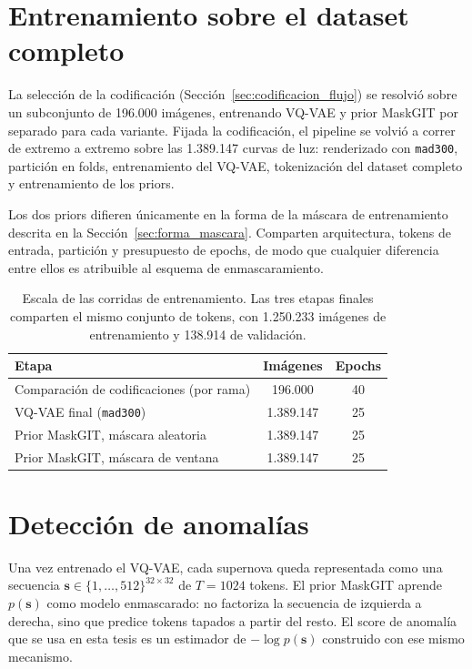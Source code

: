 \section{Entrenamiento sobre el dataset completo}
\label{sec:entrenamiento_full}

La selección de la codificación (Sección~\ref{sec:codificacion_flujo}) se resolvió sobre un subconjunto de 196.000 imágenes, entrenando VQ-VAE y prior MaskGIT por separado para cada variante. Fijada la codificación, el pipeline se volvió a correr de extremo a extremo sobre las 1.389.147 curvas de luz: renderizado con \texttt{mad300}, partición en folds, entrenamiento del VQ-VAE, tokenización del dataset completo y entrenamiento de los priors.

Los dos priors difieren únicamente en la forma de la máscara de entrenamiento descrita en la Sección~\ref{sec:forma_mascara}. Comparten arquitectura, tokens de entrada, partición y presupuesto de epochs, de modo que cualquier diferencia entre ellos es atribuible al esquema de enmascaramiento.

\begin{table}[H]
\centering
\begin{tabular}{|l|c|c|}
\hline
\textbf{Etapa} & \textbf{Imágenes} & \textbf{Epochs} \\
\hline
Comparación de codificaciones (por rama) & 196.000 & 40 \\
VQ-VAE final (\texttt{mad300}) & 1.389.147 & 25 \\
Prior MaskGIT, máscara aleatoria & 1.389.147 & 25 \\
Prior MaskGIT, máscara de ventana & 1.389.147 & 25 \\
\hline
\end{tabular}
\caption{Escala de las corridas de entrenamiento. Las tres etapas finales comparten el mismo conjunto de tokens, con 1.250.233 imágenes de entrenamiento y 138.914 de validación.}
\label{tab:corridas}
\end{table}

\section{Detección de anomalías}

Una vez entrenado el VQ-VAE, cada supernova queda representada como una secuencia $\mathbf{s} \in \{1, \ldots, 512\}^{32 \times 32}$ de $T = 1024$ tokens. El prior MaskGIT aprende $p(\mathbf{s})$ como modelo enmascarado: no factoriza la secuencia de izquierda a derecha, sino que predice tokens tapados a partir del resto. El score de anomalía que se usa en esta tesis es un estimador de $-\log p(\mathbf{s})$ construido con ese mismo mecanismo.

